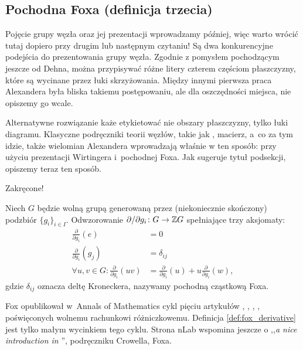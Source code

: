 
\subsection{Pochodna Foxa (definicja trzecia)}
%
Pojęcie grupy węzła oraz jej prezentacji wprowadzamy później, więc warto wrócić tutaj dopiero przy drugim lub następnym czytaniu!
Są dwa konkurencyjne podejścia do prezentowania grupy węzła.
Zgodnie z pomysłem pochodzącym jeszcze od Dehna, można przypisywać różne litery czterem częściom płaszczyzny, które są wycinane przez łuki skrzyżowania.
%
Między innymi pierwsza praca Alexandera była bliska takiemu postępowaniu, ale dla oszczędności miejsca, nie opiszemy go wcale.
%

Alternatywne rozwiązanie każe etykietować nie obszary płaszczyzny, tylko łuki diagramu.
Klasyczne podręczniki teorii węzłów, takie jak \cite{crowell1963}, macierz, a~co za tym idzie, także wielomian Alexandera wprowadzają właśnie w ten sposób: przy użyciu prezentacji Wirtingera i~pochodnej Foxa.
Jak sugeruje tytuł podsekcji, opiszemy teraz ten sposób.

Zakręcone!

\begin{definition}
\label{def:fox_derivative}%
    Niech $G$ będzie wolną grupą generowaną przez (niekoniecznie skończony) podzbiór $\{g_i\}_{i \in I}$.
    Odwzorowanie $\partial/\partial g_i \colon G \to \mathbb Z G$ spełniające trzy aksjomaty:
    \begin{align}
        \frac{\partial}{\partial g_i} (e) & = 0 \\
        \frac{\partial}{\partial g_i} (g_j) & = \delta_{ij} \\
        \forall u, v \in G : \frac{\partial}{\partial g_i} (uv) & = \frac{\partial}{\partial g_i}(u) + u \frac{\partial}{\partial g_i} (w),
    \end{align}
    gdzie $\delta_{ij}$ oznacza deltę Kroneckera, nazywamy pochodną cząstkową Foxa.
\end{definition}

Fox opublikował w~Annals of Mathematics cykl pięciu artykułów \cite{fox1953}, \cite{fox1954}, \cite{fox1956}, \cite{fox1958}, \cite{fox1960} poświęconych wolnemu rachunkowi różniczkowemu.
%
Definicja \ref{def:fox_derivative} jest tylko małym wycinkiem tego cyklu.
Strona nLab wspomina jeszcze o ,,\emph{a nice introduction in} \cite{crowell1963}'', podręczniku Crowella, Foxa.

